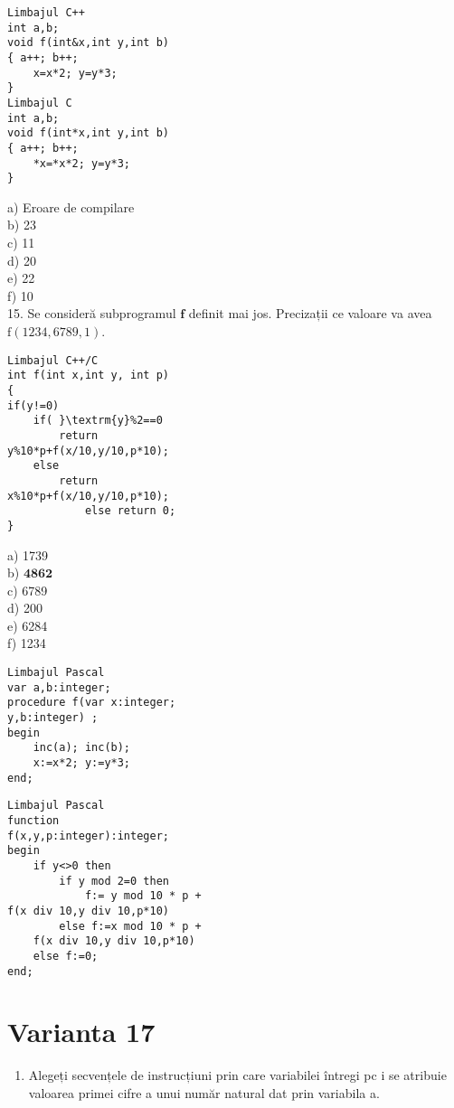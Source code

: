 \begin{verbatim}
Limbajul C++
int a,b;
void f(int&x,int y,int b)
{ a++; b++;
    x=x*2; y=y*3;
}
Limbajul C
int a,b;
void f(int*x,int y,int b)
{ a++; b++;
    *x=*x*2; y=y*3;
}
\end{verbatim}

a) Eroare de compilare\\
b) 23\\
c) 11\\
d) 20\\
e) 22\\
f) 10\\
15. Se consideră subprogramul $\mathbf{f}$ definit mai jos. Precizații ce valoare va avea $\mathrm{f}(1234,6789,1)$.

\begin{verbatim}
Limbajul C++/C
int f(int x,int y, int p)
{
if(y!=0)
    if( }\textrm{y}%2==0
        return
y%10*p+f(x/10,y/10,p*10);
    else
        return
x%10*p+f(x/10,y/10,p*10);
            else return 0;
}
\end{verbatim}

a) 1739\\
b) $\mathbf{4 8 6 2}$\\
c) 6789\\
d) 200\\
e) 6284\\
f) 1234

\begin{verbatim}
Limbajul Pascal
var a,b:integer;
procedure f(var x:integer;
y,b:integer) ;
begin
    inc(a); inc(b);
    x:=x*2; y:=y*3;
end;
\end{verbatim}

\begin{verbatim}
Limbajul Pascal
function
f(x,y,p:integer):integer;
begin
    if y<>0 then
        if y mod 2=0 then
            f:= y mod 10 * p +
f(x div 10,y div 10,p*10)
        else f:=x mod 10 * p +
    f(x div 10,y div 10,p*10)
    else f:=0;
end;
\end{verbatim}

\section*{Varianta 17}
\begin{enumerate}
  \item Alegeți secvențele de instrucțiuni prin care variabilei întregi pc i se atribuie valoarea primei cifre a unui număr natural dat prin variabila a.
\end{enumerate}


